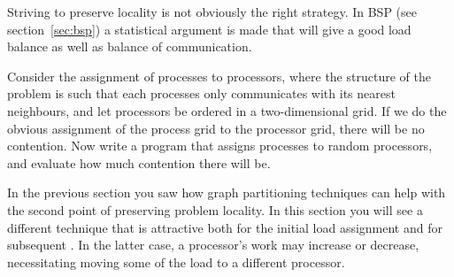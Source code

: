 Striving to preserve locality is not obviously the right strategy. In
\ac{BSP} (see section~\ref{sec:bsp}) a statistical argument is made
that  will give a good load balance as
well as balance of communication.

\begin{exercise}
  Consider the assignment of processes to processors, where the
  structure of the problem is such that 
  each processes only communicates with its
  nearest neighbours, and let processors be ordered in a
  two-dimensional grid. If we do the obvious assignment of the process
  grid to the processor grid, there will be no contention. Now write a
  program that assigns processes to random processors, and evaluate
  how much contention there will be.
\end{exercise}

In the previous section you saw how graph partitioning techniques can
help with the second point of preserving problem locality. In this
section you will see a different technique that is attractive both for
the initial load assignment and for subsequent
. In the latter case, a processor's
work may increase or decrease, necessitating moving some of the load
to a different processor.

